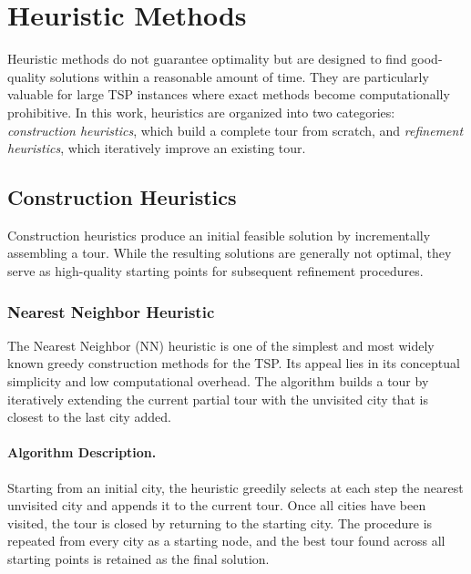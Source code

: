 \documentclass{article}
\begin{document}
\section{Heuristic Methods}

Heuristic methods do not guarantee optimality but are designed to find good-quality solutions
within a reasonable amount of time. They are particularly valuable for large TSP instances
where exact methods become computationally prohibitive. In this work, heuristics are
organized into two categories: \textit{construction heuristics}, which build a complete tour
from scratch, and \textit{refinement heuristics}, which iteratively improve an existing tour.

\subsection{Construction Heuristics}

Construction heuristics produce an initial feasible solution by incrementally assembling a
tour. While the resulting solutions are generally not optimal, they serve as high-quality
starting points for subsequent refinement procedures.

\subsubsection{Nearest Neighbor Heuristic}

The Nearest Neighbor (NN) heuristic is one of the simplest and most widely known greedy
construction methods for the TSP. Its appeal lies in its conceptual simplicity and low
computational overhead. The algorithm builds a tour by iteratively extending the current
partial tour with the unvisited city that is closest to the last city added.

\paragraph{Algorithm Description.}
Starting from an initial city, the heuristic greedily selects at each step the nearest
unvisited city and appends it to the current tour. Once all cities have been visited, the
tour is closed by returning to the starting city. The procedure is repeated from every city
as a starting node, and the best tour found across all starting points is retained as the
final solution.
\end{document}
